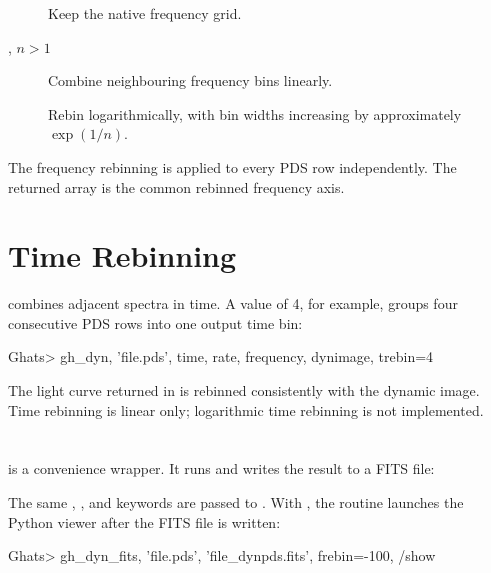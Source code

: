 \begin{description}
\item[] Keep the native frequency grid.
\item[, \(n>1\)] Combine neighbouring frequency bins linearly.
\item[] Rebin logarithmically, with bin widths increasing by
  approximately \(\exp(1/n)\).
\end{description}

The frequency rebinning is applied to every PDS row independently.  The
returned  array is the common rebinned frequency axis.

\section{Time Rebinning}

 combines adjacent spectra in time.  A value of 4, for example,
groups four consecutive PDS rows into one output time bin:

\begin{ghatsconsole}
Ghats> gh_dyn, 'file.pds', time, rate, frequency, dynimage, trebin=4
\end{ghatsconsole}

The light curve returned in  is rebinned consistently with the
dynamic image.  Time rebinning is linear only; logarithmic time rebinning is
not implemented.

\section{}

 is a convenience wrapper.  It runs  and
writes the result to a FITS file:


The same , , and  keywords are passed
to .  With , the routine launches the Python
viewer after the FITS file is written:

\begin{ghatsconsole}
Ghats> gh_dyn_fits, 'file.pds', 'file_dynpds.fits', frebin=-100, /show
\end{ghatsconsole}

